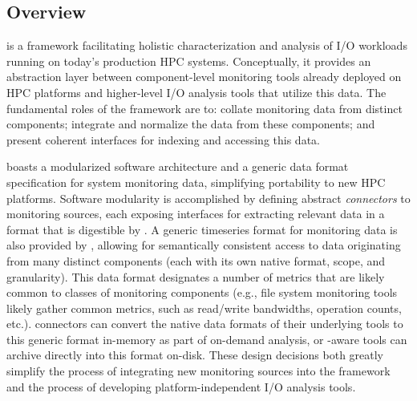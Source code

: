 \subsection{\tokio Overview}\label{sec:methods/tokio}


\tokio is a framework facilitating holistic characterization and analysis of I/O workloads running on today's production HPC systems. Conceptually, it provides an abstraction layer between component-level monitoring tools already deployed on HPC platforms and higher-level I/O analysis tools that utilize this data. The fundamental roles of the \tokio framework are to: collate monitoring data from distinct components; integrate and normalize the data from these components; and present coherent interfaces for indexing and accessing this data.

\tokio boasts a modularized software architecture and a generic data format specification for system monitoring data, simplifying portability to new HPC platforms. Software modularity is accomplished by defining abstract \textit{connectors} to monitoring sources, each exposing interfaces for extracting relevant data in a format that is digestible by \tokio.  A generic timeseries format for monitoring data is also provided by \tokio, allowing for semantically consistent access to data originating from many distinct components (each with its own native format, scope, and granularity). This data format designates a number of metrics that are likely common to classes of monitoring components (e.g., file system monitoring tools likely gather common metrics, such as read/write bandwidths, operation counts, etc.). \tokio connectors can convert the native data formats of their underlying tools to this generic format in-memory as part of on-demand analysis, or \tokio-aware tools can archive directly into this format on-disk. These design decisions both greatly simplify the process of integrating new monitoring sources into the framework and the process of developing platform-independent I/O analysis tools.

